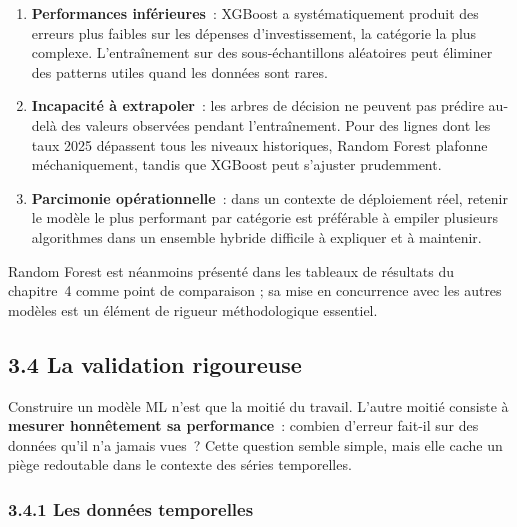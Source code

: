 \begin{enumerate}
    \item \textbf{Performances inférieures}~: XGBoost a systématiquement produit des
    erreurs plus faibles sur les dépenses d'investissement, la catégorie la plus
    complexe. L'entraînement sur des sous-échantillons aléatoires peut éliminer
    des patterns utiles quand les données sont rares.
    \item \textbf{Incapacité à extrapoler}~: les arbres de décision ne peuvent pas
    prédire au-delà des valeurs observées pendant l'entraînement. Pour des lignes
    dont les taux 2025 dépassent tous les niveaux historiques, Random Forest plafonne
    méchaniquement, tandis que XGBoost peut s'ajuster prudemment.
    \item \textbf{Parcimonie opérationnelle}~: dans un contexte de déploiement réel,
    retenir le modèle le plus performant par catégorie est préférable à empiler
    plusieurs algorithmes dans un ensemble hybride difficile à expliquer et à maintenir.
\end{enumerate}

Random Forest est néanmoins présenté dans les tableaux de résultats du chapitre~4
comme point de comparaison ; sa mise en concurrence avec les autres modèles est un
élément de rigueur méthodologique essentiel.

\subsection*{3.4 \quad La validation rigoureuse}

Construire un modèle ML n'est que la moitié du travail. L'autre moitié consiste à
\textbf{mesurer honnêtement sa performance}~: combien d'erreur fait-il sur des
données qu'il n'a jamais vues~? Cette question semble simple, mais elle cache un
piège redoutable dans le contexte des séries temporelles.

\subsubsection*{3.4.1 \quad Les données temporelles}

